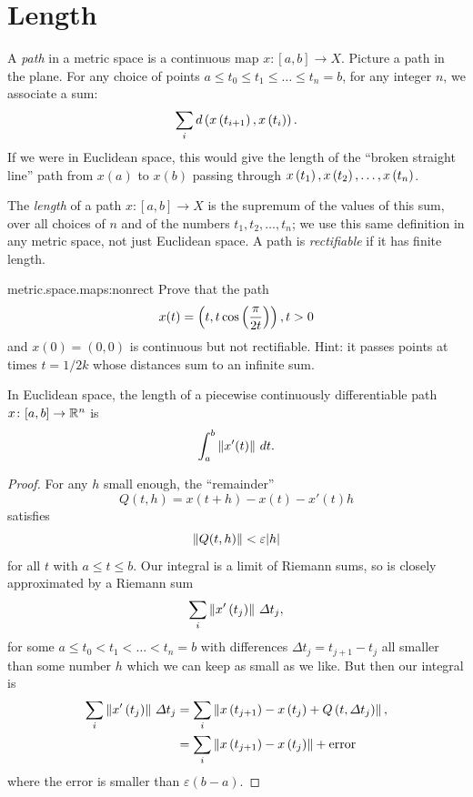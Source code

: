 \section{Length}
A \emph{path} in a metric space is a continuous map \(x \colon [a,b] \to X\).
Picture a path in the plane.
For any choice of points \(a \le t_0 \le t_1 \le \dots \le t_n=b\), for any integer \(n\), we associate a sum:
\[
\sum_i d\left(x\left(t_{i+1}\right),x\left(t_i\right)\right).
\]
If we were in Euclidean space, this would give the length of the ``broken straight line'' path from \(x(a)\) to \(x(b)\) passing through \(x\left(t_1\right), x\left(t_2\right), \dots, x\left(t_n\right)\).
\begin{center}

\end{center}
The \emph{length} of a path \(x \colon [a,b] \to X\) is the supremum of the values of this sum, over all choices of \(n\) and of the numbers \(t_1, t_2, \dots, t_n\); we use this same definition in any metric space, not just Euclidean space.
A path is \emph{rectifiable} if it has finite length.
\begin{problem}{metric.space.maps:nonrect}
Prove that the path
\[
x(t)=\left(t,t\cos\left(\frac{\pi}{2t}\right)\right), t>0
\]
and \(x(0)=(0,0)\)  is continuous but not rectifiable.
Hint: it passes points at times \(t=1/2k\) whose distances sum to an infinite sum.
\end{problem}
\begin{lemma}
In Euclidean space, the length of a piecewise continuously differentiable path \(x \colon [a,b] \to \mathbb{R}^{n}\) is
\[
\int_a^b \left\|x'(t)\right\| \, dt.
\]
\end{lemma}
\begin{proof}
For any \(h\) small enough, the ``remainder''
\[
Q(t,h) = x(t+h)-x(t)-x'(t)h
\]
satisfies
\[
\left\|Q(t,h)\right\| < \varepsilon |h|
\]
for all \(t\) with \(a \le t \le b\).
Our integral is a limit of Riemann sums, so is closely approximated by a Riemann sum
\[
\sum_i \left\|x'\left(t_j\right)\right\| \, \Delta t_j,
\]
for some \(a \le t_0 < t_1 < \dots < t_n=b\) with differences \(\Delta t_j = t_{j+1} - t_j\) all smaller than some number \(h\) which we can keep as small as we like.
But then our integral is 
\begin{align*}
\sum_i \left\|x'\left(t_j\right)\right\| \, \Delta t_j
&=
\sum_i \left\|x\left(t_{j+1}\right)-x\left(t_j\right)+Q\left(t,\Delta t_j\right)\right\|,
\\
&=
\sum_i \left\|x\left(t_{j+1}\right)-x\left(t_j\right)\right\| + \text{error}
\end{align*}
where the error is smaller than \(\varepsilon(b-a)\).
\end{proof}
